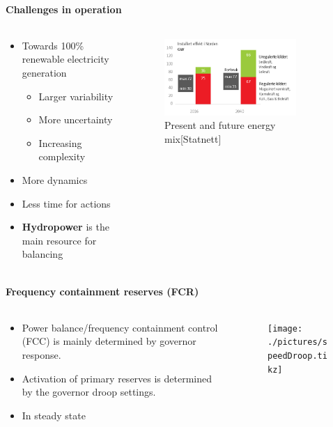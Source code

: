 \begin{frame}{\secname}
	\framesubtitle{Challenges in operation}
	\begin{columns}
		\begin{column}{0.5\textwidth}
		\begin{itemize}
			\item<1-> Towards 100\% renewable electricity generation
			\begin{itemize}
				\item Larger variability
				\item More uncertainty
				\item Increasing complexity
			\end{itemize}
			\item<2-> More dynamics
			\item<3-> Less time for actions
			\item<4-> \textbf{Hydropower} is the main resource for balancing
\end{itemize}
\end{column}
	\begin{column}{0.5\textwidth}
	\begin{figure}
	\includegraphics[width=0.8\textwidth]{./pictures/mix}
	\caption{Present and future energy mix[Statnett]}
	\end{figure}
	\end{column}
	\end{columns}
\end{frame}
\begin{frame}{\secname}
	\framesubtitle{Frequency containment reserves (FCR)}
	\begin{columns}
		\begin{column}{0.5\textwidth}
			\begin{itemize}
				\item<1-> Power balance/frequency containment control (FCC) is mainly determined by governor response.
				\item<1-> Activation of primary reserves is determined by the governor droop settings.
				\item<2-> In steady state
			\end{itemize}
		\end{column}
		\begin{column}{0.5\textwidth}	
			\begin{figure}
					\texttt{[image: ./pictures/speedDroop.tikz]}
			\end{figure}
		\end{column}
	\end{columns}
\end{frame}

